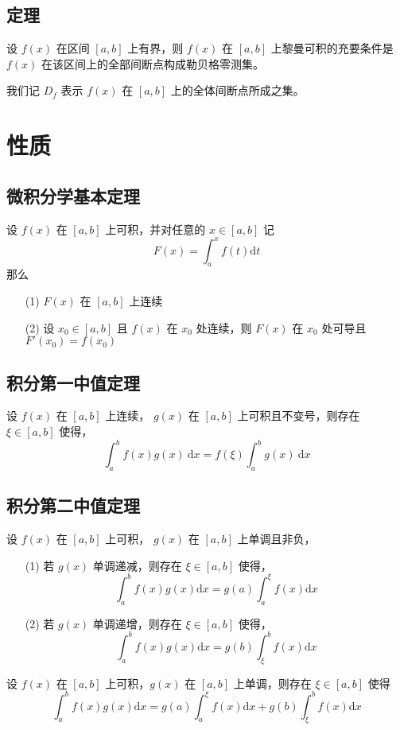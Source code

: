 		\subsection{定理}
			设 $f(x)$ 在区间 $[a,b]$ 上有界，则 $f(x)$ 在 $[a,b]$ 上黎曼可积的充要条件是 $f(x)$ 在该区间上的全部间断点构成勒贝格零测集。
			
			我们记 $D_f$ 表示 $f(x)$ 在 $[a,b]$ 上的全体间断点所成之集。
			
	\section{性质}
		\subsection{微积分学基本定理}
			设 $f(x)$ 在 $[a,b]$ 上可积，并对任意的 $x \in [a,b]$ 记 $$F(x)=\int_a^x f(t) \text{d}t$$ 那么
			
			\begin{itemize}[leftmargin=1cm,itemindent=1cm]
				\item[(1)] $F(x)$ 在 $[a,b]$ 上连续
				\item[(2)] 设 $x_0\in [a,b]$ 且 $f(x)$ 在 $x_0$ 处连续，则 $F(x)$ 在 $x_0$ 处可导且 $F'(x_0)=f(x_0)$
			\end{itemize}
		\subsection{积分第一中值定理}
			设 $f(x)$ 在 $[a,b]$ 上连续， $g(x)$ 在 $[a,b]$ 上可积且不变号，则存在 $\xi\in [a,b]$ 使得，
			$$\int_a^b f(x)g(x)\  \text{d} x = f(\xi)\int_a^b g(x)\  \text{d} x$$
		\subsection{积分第二中值定理}
			设 $f(x)$ 在 $[a,b]$ 上可积， $g(x)$ 在 $[a,b]$ 上单调且非负，
			
			\begin{itemize}[leftmargin=1cm, itemindent=1cm]
				\item[(1)] 若 $g(x)$ 单调递减，则存在 $\xi \in [a,b]$ 使得，$$\int_a^b f(x)g(x) \text{d}x = g(a)\int_a^{\xi} f(x) \text{d} x$$
				
				\item[(2)] 若 $g(x)$ 单调递增，则存在 $\xi \in [a,b]$ 使得，$$\int_a^b f(x)g(x) \text{d} x = g(b) \int_{\xi}^b f(x) \text{d} x$$
			\end{itemize}
			
			设 $f(x)$ 在 $[a,b]$ 上可积，$g(x)$ 在 $[a,b]$ 上单调，则存在 $\xi \in [a,b]$ 使得 $$\int_a^b f(x)g(x)\text{d} x = g(a)\int_a^{\xi}f(x) \text{d} x + g(b) \int_{\xi}^b f(x)\text{d} x$$